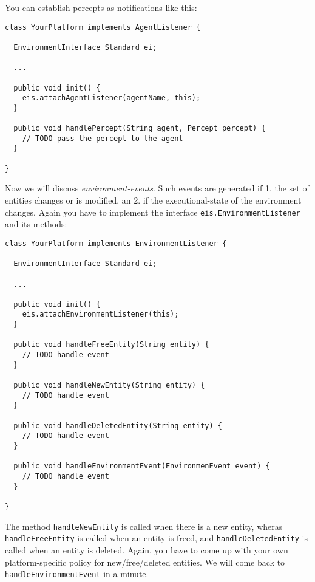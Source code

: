 \documentclass[a4]{article}
\begin{document}
You can establish percepts-as-notifications like this:
\begin{verbatim}
class YourPlatform implements AgentListener {

  EnvironmentInterface Standard ei;
  
  ...

  public void init() {
    eis.attachAgentListener(agentName, this);
  }

  public void handlePercept(String agent, Percept percept) {
    // TODO pass the percept to the agent
  }

}
\end{verbatim}

Now we will discuss \emph{environment-events}. Such events are generated if 1. the set of entities changes or is modified, an 2. if the executional-state of the environment changes. Again you have to implement the interface 
\texttt{eis.EnvironmentListener} and its
methods: 
\begin{verbatim}
class YourPlatform implements EnvironmentListener {

  EnvironmentInterface Standard ei;
  
  ...

  public void init() {
    eis.attachEnvironmentListener(this);
  }

  public void handleFreeEntity(String entity) {
    // TODO handle event
  }
  
  public void handleNewEntity(String entity) {
    // TODO handle event
  }
  
  public void handleDeletedEntity(String entity) {
    // TODO handle event
  }
  
  public void handleEnvironmentEvent(EnvironmenEvent event) {
    // TODO handle event
  }

}
\end{verbatim}

The method \texttt{handleNewEntity} is called when there is a new entity, wheras \texttt{handleFreeEntity} is called
when an entity is freed, and \texttt{handleDeletedEntity} is called when an entity is deleted. 
Again, you have to come up with your own platform-specific policy for new/free/deleted entities. 
We will come back to \texttt{handleEnvironmentEvent} in a minute.
\end{document}
